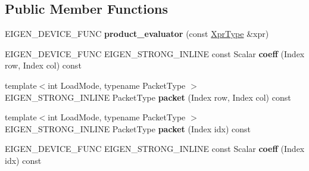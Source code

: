 \subsection*{Public Member Functions}
\begin{DoxyCompactItemize}
\item 
\mbox{\label{struct_eigen_1_1internal_1_1product__evaluator_3_01_product_3_01_lhs_00_01_rhs_00_01_product_kinb2964e3ecd5359c634047e003305b765_ac6cccd1119f2e85561b39405cfe45701}} 
E\+I\+G\+E\+N\+\_\+\+D\+E\+V\+I\+C\+E\+\_\+\+F\+U\+NC {\bfseries product\+\_\+evaluator} (const \mbox{\hyperlink{class_eigen_1_1_product}{Xpr\+Type}} \&xpr)
\item 
\mbox{\label{struct_eigen_1_1internal_1_1product__evaluator_3_01_product_3_01_lhs_00_01_rhs_00_01_product_kinb2964e3ecd5359c634047e003305b765_a1deb55597b47dd0d58aac048681c04ec}} 
E\+I\+G\+E\+N\+\_\+\+D\+E\+V\+I\+C\+E\+\_\+\+F\+U\+NC E\+I\+G\+E\+N\+\_\+\+S\+T\+R\+O\+N\+G\+\_\+\+I\+N\+L\+I\+NE const Scalar {\bfseries coeff} (Index row, Index col) const
\item 
\mbox{\label{struct_eigen_1_1internal_1_1product__evaluator_3_01_product_3_01_lhs_00_01_rhs_00_01_product_kinb2964e3ecd5359c634047e003305b765_a5145f2e8510f65f00c44756358f1c980}} 
{\footnotesize template$<$int Load\+Mode, typename Packet\+Type $>$ }\\E\+I\+G\+E\+N\+\_\+\+S\+T\+R\+O\+N\+G\+\_\+\+I\+N\+L\+I\+NE Packet\+Type {\bfseries packet} (Index row, Index col) const
\item 
\mbox{\label{struct_eigen_1_1internal_1_1product__evaluator_3_01_product_3_01_lhs_00_01_rhs_00_01_product_kinb2964e3ecd5359c634047e003305b765_acf21166af0d8813ad33c63e47fc58c5a}} 
{\footnotesize template$<$int Load\+Mode, typename Packet\+Type $>$ }\\E\+I\+G\+E\+N\+\_\+\+S\+T\+R\+O\+N\+G\+\_\+\+I\+N\+L\+I\+NE Packet\+Type {\bfseries packet} (Index idx) const
\item 
\mbox{\label{struct_eigen_1_1internal_1_1product__evaluator_3_01_product_3_01_lhs_00_01_rhs_00_01_product_kinb2964e3ecd5359c634047e003305b765_a0b502bff8d9694d1ba557b2def781917}} 
E\+I\+G\+E\+N\+\_\+\+D\+E\+V\+I\+C\+E\+\_\+\+F\+U\+NC E\+I\+G\+E\+N\+\_\+\+S\+T\+R\+O\+N\+G\+\_\+\+I\+N\+L\+I\+NE const Scalar {\bfseries coeff} (Index idx) const
\end{DoxyCompactItemize}
